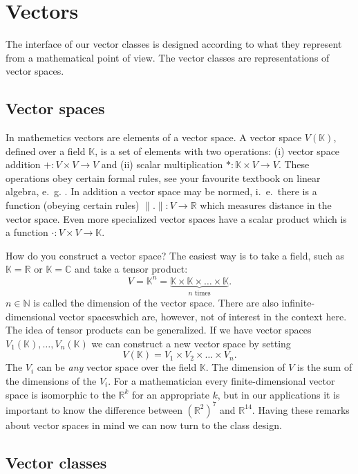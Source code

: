 \documentclass[11pt]{article}
\newcommand{\C}{\mathbb{C}}
\newcommand{\R}{\mathbb{R}}
\newcommand{\N}{\mathbb{N}}
\newcommand{\K}{\mathbb{K}}
\begin{document}
\section{Vectors}

The interface of our vector classes is designed according to what they
represent from a mathematical point of view. The vector classes are
representations of vector spaces.

\subsection{Vector spaces}

In mathemetics vectors are elements of a vector space. A vector space
$V(\K)$, defined over a field $\K$, is a set of elements with two
operations: (i) vector space addition $+ : V\times V \to V$ and (ii) scalar
multiplication $* : \K\times V \to V$. These operations obey certain formal
rules, see your favourite textbook on linear algebra,
e.~g. \cite{LaBook}. In addition a 
vector space may be normed, i.~e.~there is a function (obeying certain
rules) $\|.\| : V \to \R$ which measures distance in the vector
space. Even more specialized vector spaces have a scalar product which
is a function $\cdot : V\times V \to \K$. 

How do you construct a vector space? The easiest way is to take a
field, such as $\K=\R$ or $\K=\C$ and take a tensor product:
\begin{equation*}
V = \K^n = \underbrace{\K\times\K\times\ldots\times\K}_{\text{$n$ times}}.
\end{equation*} 
$n\in\N$ is called the dimension of the vector space. There are also
infinite-dimensional vector spaceswhich are, however, not of interest
in the context here. The idea of tensor products can be generalized.
If we have vector spaces $V_1(\K),\ldots,V_n(\K)$ we can construct a
new vector space by setting
\begin{equation*}
V(\K) = V_1\times V_2 \times \ldots \times V_n.
\end{equation*} 
The $V_i$ can be \textit{any} vector space over the field $\K$. The
dimension of $V$ is the sum of the dimensions of the $V_i$. For a
mathematician every finite-dimensional vector space is isomorphic to
the $\R^k$ for an appropriate $k$, but in our applications it is
important to know the difference between $(\R^2)^7$ and
$\R^{14}$. Having these remarks about vector spaces in mind we can now
turn to the class design.

\subsection{Vector classes}
\end{document}
